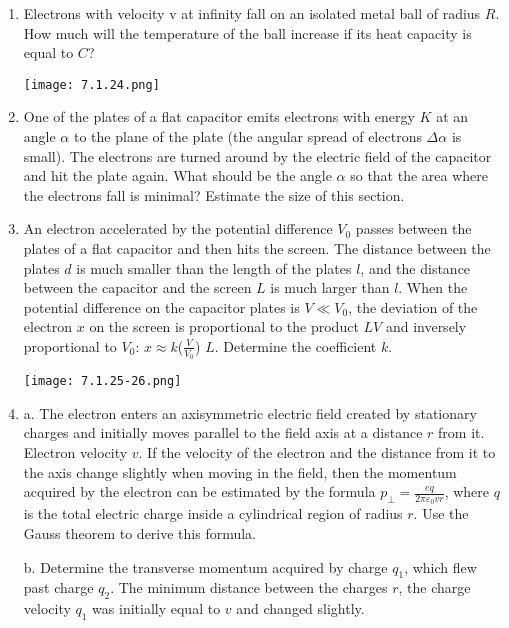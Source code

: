 \documentclass{article}
\begin{document}
\begin{enumerate}[label=7.1.\arabic*]
\item Electrons with velocity v at infinity fall on an isolated metal ball of radius $R$. How much will the temperature of the ball increase if its heat capacity is equal to $C$?

\begin{center}
    \texttt{[image: 7.1.24.png]}
\end{center}

\item One of the plates of a flat capacitor emits electrons with energy $K$ at an angle $\alpha$ to the plane of the plate (the angular spread of electrons $\Delta \alpha$ is small). The electrons are turned around by the electric field of the capacitor and hit the plate again. What should be the angle $\alpha$ so that the area where the electrons fall is minimal? Estimate the size of this section.

\item An electron accelerated by the potential difference $V_0$ passes between the plates of a flat capacitor and then hits the screen. The distance between the plates $d$ is much smaller than the length of the plates $l$, and the distance between the capacitor and the screen $L$ is much larger than $l$. When the potential difference on the capacitor plates is $V \ll V_0$, the deviation of the electron $x$ on the screen is proportional to the product $LV$ and inversely proportional to $V_0$: $x \approx k$($\frac{V}{V_0}$) $L$. Determine the coefficient $k$.

\begin{center}
    \texttt{[image: 7.1.25-26.png]}
\end{center}

\item a. The electron enters an axisymmetric electric field created by stationary charges and initially moves parallel to the field axis at a distance $r$ from it. Electron velocity $v$. If the velocity of the electron and the distance from it to the axis change slightly when moving in the field, then the momentum acquired by the electron can be estimated by the formula $p_{\perp} = \frac{eq}{2 \pi \varepsilon_0 v r}$, where $q$ is the total electric charge inside a cylindrical region of radius $r$. Use the Gauss theorem to derive this formula. 



b. Determine the transverse momentum acquired by charge $q_1$, which flew past charge $q_2$. The minimum distance between the charges $r$, the charge velocity $q_1$ was initially equal to $v$ and changed slightly. 


\end{enumerate}
\end{document}
